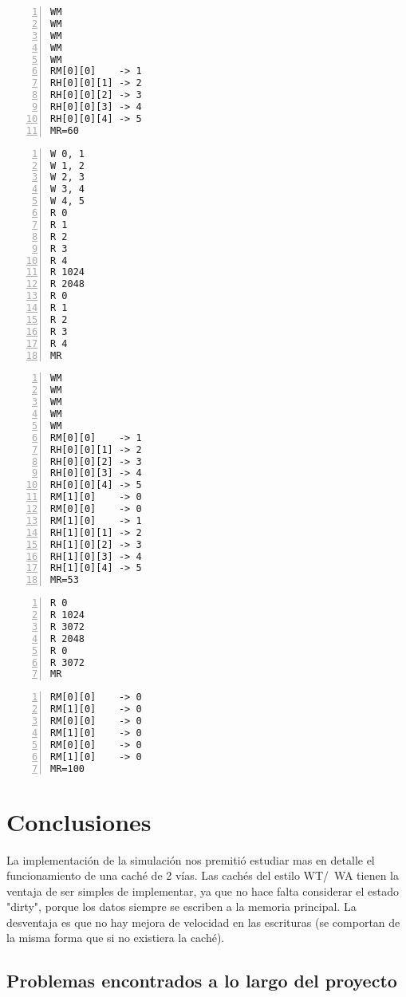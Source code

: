 \documentclass[11pt,a4paper, spanish]{article}
\begin{document}
\begin{lstlisting}[numbers=left, tabsize=2, basicstyle=\fontsize{11}{13}\ttfamily, frame=single, caption={Resultado prueba3.mem}]
WM
WM
WM
WM
WM
RM[0][0]    -> 1
RH[0][0][1] -> 2
RH[0][0][2] -> 3
RH[0][0][3] -> 4
RH[0][0][4] -> 5
MR=60
\end{lstlisting}

\begin{lstlisting}[numbers=left, tabsize=2, basicstyle=\fontsize{11}{13}\ttfamily, frame=single, caption={prueba4.mem}]
W 0, 1
W 1, 2
W 2, 3
W 3, 4
W 4, 5
R 0
R 1
R 2
R 3
R 4
R 1024
R 2048
R 0
R 1
R 2
R 3
R 4
MR
\end{lstlisting}

\begin{lstlisting}[numbers=left, tabsize=2, basicstyle=\fontsize{11}{13}\ttfamily, frame=single, caption={Resultado prueba4.mem}]
WM
WM
WM
WM
WM
RM[0][0]    -> 1
RH[0][0][1] -> 2
RH[0][0][2] -> 3
RH[0][0][3] -> 4
RH[0][0][4] -> 5
RM[1][0]    -> 0
RM[0][0]    -> 0
RM[1][0]    -> 1
RH[1][0][1] -> 2
RH[1][0][2] -> 3
RH[1][0][3] -> 4
RH[1][0][4] -> 5
MR=53
\end{lstlisting}

\begin{lstlisting}[numbers=left, tabsize=2, basicstyle=\fontsize{11}{13}\ttfamily, frame=single, caption={prueba5.mem}]
R 0
R 1024
R 3072
R 2048
R 0
R 3072
MR
\end{lstlisting}

\begin{lstlisting}[numbers=left, tabsize=2, basicstyle=\fontsize{11}{13}\ttfamily, frame=single, caption={Resultado prueba5.mem}]
RM[0][0]    -> 0
RM[1][0]    -> 0
RM[0][0]    -> 0
RM[1][0]    -> 0
RM[0][0]    -> 0
RM[1][0]    -> 0
MR=100
\end{lstlisting}

\section{Conclusiones}

La implementación de la simulación nos premitió estudiar mas en detalle el funcionamiento de una caché de 2 vías. Las cachés
del estilo WT/~WA tienen la ventaja de ser simples de implementar, ya que no hace falta considerar el estado "dirty",
porque los datos siempre se escriben a la memoria principal. La desventaja es que no hay mejora de velocidad en las
escrituras (se comportan de la misma forma que si no existiera la caché).


\subsection{Problemas encontrados a lo largo del proyecto}
\end{document}
